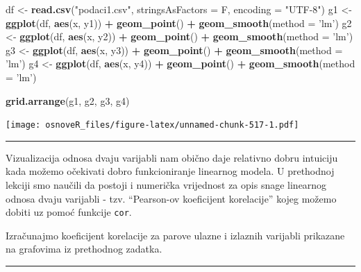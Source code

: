 \documentclass[]{book}
\newenvironment{Shaded}{\begin{snugshade}}{\end{snugshade}}
\newcommand{\KeywordTok}[1]{\textcolor[rgb]{0.13,0.29,0.53}{\textbf{#1}}}
\newcommand{\DataTypeTok}[1]{\textcolor[rgb]{0.13,0.29,0.53}{#1}}
\newcommand{\StringTok}[1]{\textcolor[rgb]{0.31,0.60,0.02}{#1}}
\newcommand{\OperatorTok}[1]{\textcolor[rgb]{0.81,0.36,0.00}{\textbf{#1}}}
\newcommand{\NormalTok}[1]{#1}
\theoremstyle{definition}
\theoremstyle{definition}
\theoremstyle{definition}
\theoremstyle{remark}
\begin{document}
\begin{Shaded}
\begin{Highlighting}[]
\NormalTok{df <-}\StringTok{ }\KeywordTok{read.csv}\NormalTok{(}\StringTok{"podaci1.csv"}\NormalTok{, }\DataTypeTok{stringsAsFactors =}\NormalTok{ F, }\DataTypeTok{encoding =} \StringTok{"UTF-8"}\NormalTok{)}
\NormalTok{g1 <-}\StringTok{ }\KeywordTok{ggplot}\NormalTok{(df, }\KeywordTok{aes}\NormalTok{(x, y1)) }\OperatorTok{+}\StringTok{ }\KeywordTok{geom_point}\NormalTok{() }\OperatorTok{+}\StringTok{ }\KeywordTok{geom_smooth}\NormalTok{(}\DataTypeTok{method =} \StringTok{'lm'}\NormalTok{) }
\NormalTok{g2 <-}\StringTok{ }\KeywordTok{ggplot}\NormalTok{(df, }\KeywordTok{aes}\NormalTok{(x, y2)) }\OperatorTok{+}\StringTok{ }\KeywordTok{geom_point}\NormalTok{() }\OperatorTok{+}\StringTok{ }\KeywordTok{geom_smooth}\NormalTok{(}\DataTypeTok{method =} \StringTok{'lm'}\NormalTok{) }
\NormalTok{g3 <-}\StringTok{ }\KeywordTok{ggplot}\NormalTok{(df, }\KeywordTok{aes}\NormalTok{(x, y3)) }\OperatorTok{+}\StringTok{ }\KeywordTok{geom_point}\NormalTok{() }\OperatorTok{+}\StringTok{ }\KeywordTok{geom_smooth}\NormalTok{(}\DataTypeTok{method =} \StringTok{'lm'}\NormalTok{) }
\NormalTok{g4 <-}\StringTok{ }\KeywordTok{ggplot}\NormalTok{(df, }\KeywordTok{aes}\NormalTok{(x, y4)) }\OperatorTok{+}\StringTok{ }\KeywordTok{geom_point}\NormalTok{() }\OperatorTok{+}\StringTok{ }\KeywordTok{geom_smooth}\NormalTok{(}\DataTypeTok{method =} \StringTok{'lm'}\NormalTok{) }


\KeywordTok{grid.arrange}\NormalTok{(g1, g2, g3, g4)}
\end{Highlighting}
\end{Shaded}

\texttt{[image: osnoveR\_files/figure-latex/unnamed-chunk-517-1.pdf]}

\begin{center}\rule{0.5\linewidth}{\linethickness}\end{center}

Vizualizacija odnosa dvaju varijabli nam obično daje relativno dobru
intuiciju kada možemo očekivati dobro funkcioniranje linearnog modela. U
prethodnoj lekciji smo naučili da postoji i numerička vrijednost za opis
snage linearnog odnosa dvaju varijabli - tzv. ``Pearson-ov koeficijent
korelacije'' kojeg možemo dobiti uz pomoć funkcije \texttt{cor}.

Izračunajmo koeficijent korelacije za parove ulazne i izlaznih varijabli
prikazane na grafovima iz prethodnog zadatka.

\begin{center}\rule{0.5\linewidth}{\linethickness}\end{center}
\end{document}
